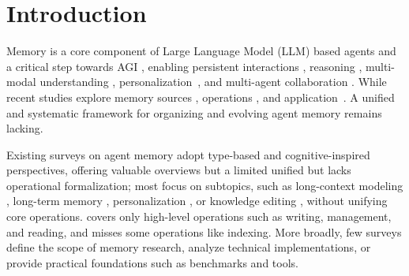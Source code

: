 \documentclass[manuscript,screen]{acmart}
\begin{document}
\begin{abstract}
\textbf{Abstract:} Memory is fundamental to large language model (LLM)-based agents, but existing surveys emphasize application-level use (e.g., personalized dialogue), while overlooking the atomic operations governing memory dynamics. This work categorizes memory into parametric (implicit in model weights) and contextual (explicit external data, structured/unstructured) forms, and defines six core operations: Consolidation, Updating, Indexing, Forgetting, Retrieval, and Condensation. Mapping these dimensions reveals four key research topics: long-term, long-context, parametric modification, and multi-source memory. The taxonomy provides a structured view of memory-related research, benchmarks, and tools, clarifying functional interactions in LLM-based agents and guiding future advancements. The datasets, papers, and tools are publicly available at \url{https://github.com/Elvin-Yiming-Du/Survey_Memory_in_AI}.
\end{abstract}

\maketitle

\section{Introduction}
\label{sec:introduction}
Memory is a core component of Large Language Model (LLM) based agents \citep{wang2024towards} and a critical step towards AGI \citep{park2023generative}, %
enabling persistent %
interactions \citep{maharana2024evaluating, zhong2024memorybank}, %
reasoning \citep{ge2025tremu}, %
multi-modal understanding \citep{long2025seeinglisteningrememberingreasoning}, %
personalization~\citep{li2024hello},
and %
multi-agent collaboration \citep{wang2025mirix}. While recent studies explore %
memory %
sources \citep{miao2024episodic, du2024perltqa}, operations \citep{yu2025memagent, cao2025memory, wang2025new, zhong2024memorybank}, and application~\citep{hong2023cogagent, mem0, long2025seeinglisteningrememberingreasoning, memobase2025}. A unified and systematic framework for organizing and evolving agent memory remains lacking.  

Existing surveys on agent memory adopt type-based and cognitive-inspired perspectives, offering valuable overviews but a limited unified 
but lacks operational formalization; most focus on subtopics, such as long-context modeling \citep{huang2023advancing}, long-term memory \citep{he2024human, jiang2024long}, personalization \citep{liu2025survey}, or knowledge editing \citep{wang2024knowledge}, without unifying core operations. \citet{zhang2024survey} covers only high-level operations such as writing, management, and reading, and misses some operations like indexing. More broadly, few surveys define the scope of memory research, analyze technical implementations, or provide practical foundations such as benchmarks and tools.
\end{document}
